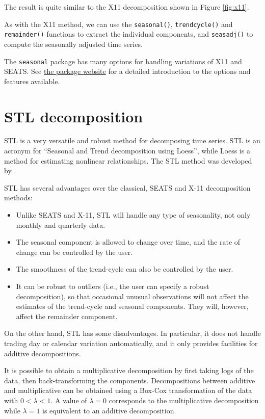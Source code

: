 \documentclass[]{book}
\begin{document}
The result is quite similar to the X11 decomposition shown in Figure \ref{fig:x11}.

As with the X11 method, we can use the \texttt{seasonal()}, \texttt{trendcycle()} and \texttt{remainder()} functions to extract the individual components, and \texttt{seasadj()} to compute the seasonally adjusted time series.

The \texttt{seasonal} package has many options for handling variations of X11 and SEATS. See \href{http://www.seasonal.website/seasonal.html}{the package website} for a detailed introduction to the options and features available.

\hypertarget{sec-6-stl}{%
\section{STL decomposition}\label{sec-6-stl}}

STL is a very versatile and robust method for decomposing time series. STL is an acronym for ``Seasonal and Trend decomposition using Loess'', while Loess is a method for estimating nonlinear relationships. The STL method was developed by \citet{Cleveland1990}.

STL has several advantages over the classical, SEATS and X-11 decomposition methods:

\begin{itemize}
\item
  Unlike SEATS and X-11, STL will handle any type of seasonality, not only monthly and quarterly data.
\item
  The seasonal component is allowed to change over time, and the rate of change can be controlled by the user.
\item
  The smoothness of the trend-cycle can also be controlled by the user.
\item
  It can be robust to outliers (i.e., the user can specify a robust decomposition), so that occasional unusual observations will not affect the estimates of the trend-cycle and seasonal components. They will, however, affect the remainder component.
\end{itemize}

On the other hand, STL has some disadvantages. In particular, it does not handle trading day or calendar variation automatically, and it only provides facilities for additive decompositions.

It is possible to obtain a multiplicative decomposition by first taking logs of the data, then back-transforming the components. Decompositions between additive and multiplicative can be obtained using a Box-Cox transformation of the data with \(0<\lambda<1\). A value of \(\lambda=0\) corresponds to the multiplicative decomposition while \(\lambda=1\) is equivalent to an additive decomposition.
\end{document}
